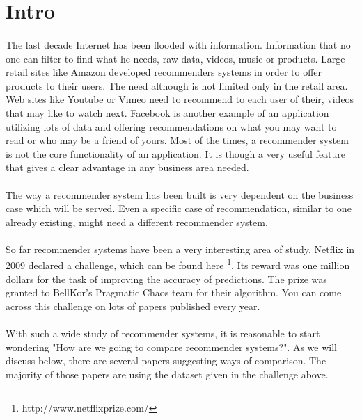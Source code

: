 \section{Intro}
\paragraph{} The last decade Internet has been flooded with information. Information that no one can filter to find what he needs, raw data, videos, music or products. Large retail sites like Amazon developed recommenders systems in order to offer products to their users. The need although is not limited only in the retail area. Web sites like Youtube or Vimeo need to recommend to each user of their, videos that may like to watch next. Facebook is another example of an application utilizing lots of data and offering recommendations on what you may want to read or who may be a friend of yours. Most of the times, a recommender system is not the core functionality of an application. It is though a very useful feature that gives a clear advantage in any business area needed.

\paragraph{}The way a recommender system has been built is very dependent on the business case which will be served. Even a specific case of recommendation, similar to one already existing, might need a different recommender system.

\paragraph{} So far recommender systems have been a very interesting area of study. Netflix in 2009 declared a challenge, which can be found here \footnote{http://www.netflixprize.com/}. Its  reward was one million dollars for the task of improving the accuracy of predictions. The prize was granted to BellKor’s Pragmatic Chaos team for their algorithm. You can come across this challenge on lots of papers published every year.

\paragraph{} With such a wide study of recommender systems, it is reasonable to start wondering "How are we going to compare recommender systems?". As we will discuss below, there are several papers suggesting ways of comparison. The majority of those papers are using the dataset given in the challenge above.

